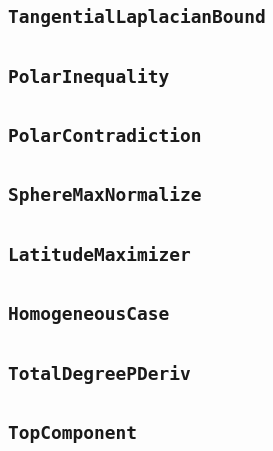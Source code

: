 \documentclass[11pt]{amsart}
\theoremstyle{definition}
\begin{document}
\subsection{\texorpdfstring{\texttt{TangentialLaplacianBound}}{TangentialLaplacianBound}}\label{node:TangentialLaplacianBound}


\subsection{\texorpdfstring{\texttt{PolarInequality}}{PolarInequality}}\label{node:PolarInequality}


\subsection{\texorpdfstring{\texttt{PolarContradiction}}{PolarContradiction}}\label{node:PolarContradiction}


\subsection{\texorpdfstring{\texttt{SphereMaxNormalize}}{SphereMaxNormalize}}\label{node:SphereMaxNormalize}


\subsection{\texorpdfstring{\texttt{LatitudeMaximizer}}{LatitudeMaximizer}}\label{node:LatitudeMaximizer}


\subsection{\texorpdfstring{\texttt{HomogeneousCase}}{HomogeneousCase}}\label{node:HomogeneousCase}


\subsection{\texorpdfstring{\texttt{TotalDegreePDeriv}}{TotalDegreePDeriv}}\label{node:TotalDegreePDeriv}


\subsection{\texorpdfstring{\texttt{TopComponent}}{TopComponent}}\label{node:TopComponent}

\end{document}
